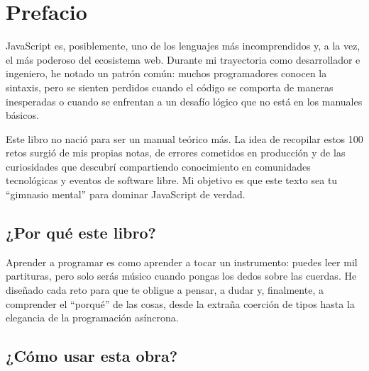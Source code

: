 \documentclass[
  letterpaper,
  DIV=11,
  numbers=noendperiod]{scrreprt}
\author{}
\date{}
\renewcommand*\contentsname{Table of contents}
\newcommand\contentsname{Table of contents}
\begin{document}


\renewcommand*\contentsname{Table of contents}
{
\hypersetup{linkcolor=}
\setcounter{tocdepth}{2}
\tableofcontents
}


\chapter*{Prefacio}\label{prefacio}


JavaScript es, posiblemente, uno de los lenguajes más incomprendidos y,
a la vez, el más poderoso del ecosistema web. Durante mi trayectoria
como desarrollador e ingeniero, he notado un patrón común: muchos
programadores conocen la sintaxis, pero se sienten perdidos cuando el
código se comporta de maneras inesperadas o cuando se enfrentan a un
desafío lógico que no está en los manuales básicos.

Este libro no nació para ser un manual teórico más. La idea de recopilar
estos 100 retos surgió de mis propias notas, de errores cometidos en
producción y de las curiosidades que descubrí compartiendo conocimiento
en comunidades tecnológicas y eventos de software libre. Mi objetivo es
que este texto sea tu ``gimnasio mental'' para dominar JavaScript de
verdad.

\section*{¿Por qué este libro?}\label{por-quuxe9-este-libro}


Aprender a programar es como aprender a tocar un instrumento: puedes
leer mil partituras, pero solo serás músico cuando pongas los dedos
sobre las cuerdas. He diseñado cada reto para que te obligue a pensar, a
dudar y, finalmente, a comprender el ``porqué'' de las cosas, desde la
extraña coerción de tipos hasta la elegancia de la programación
asíncrona.

\section*{¿Cómo usar esta obra?}\label{cuxf3mo-usar-esta-obra}
\end{document}

